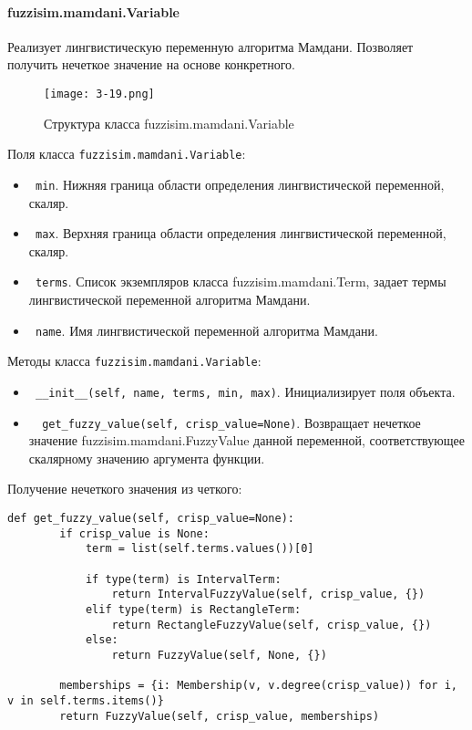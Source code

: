 \paragraph{fuzzisim.mamdani.Variable}
Реализует лингвистическую переменную алгоритма Мамдани. Позволяет получить нечеткое значение на основе конкретного.

\begin{figure}[ht]
	\centering
	\texttt{[image: 3-19.png]}
	\caption{ Структура класса fuzzisim.mamdani.Variable}
\end{figure}

Поля класса \lstinline!fuzzisim.mamdani.Variable!:
\begin{itemize}
	\item \lstinline! min!. Нижняя граница области определения лингвистической переменной, скаляр.
	\item \lstinline! max!. Верхняя граница области определения лингвистической переменной, скаляр.
	\item \lstinline! terms!.   Список экземпляров класса  fuzzisim.mamdani.Term, задает термы лингвистической переменной алгоритма Мамдани.
	\item \lstinline! name!. Имя лингвистической переменной алгоритма Мамдани.
\end{itemize}


Методы класса \lstinline!fuzzisim.mamdani.Variable!:
\begin{itemize}
	\item \lstinline! __init__(self, name, terms, min, max)!. Инициализирует поля объекта.
	\item \lstinline!  get_fuzzy_value(self, crisp_value=None)!. Возвращает нечеткое значение fuzzisim.mamdani.FuzzyValue данной переменной, соответствующее скалярному значению аргумента функции.
\end{itemize}


Получение нечеткого значения из четкого:
\begin{lstlisting}[style=pythonstyle,caption={  }, label=lst:func:1]
	def get_fuzzy_value(self, crisp_value=None):
		if crisp_value is None:
			term = list(self.terms.values())[0]
			
			if type(term) is IntervalTerm:
				return IntervalFuzzyValue(self, crisp_value, {})
			elif type(term) is RectangleTerm:
				return RectangleFuzzyValue(self, crisp_value, {})
			else:
				return FuzzyValue(self, None, {})

		memberships = {i: Membership(v, v.degree(crisp_value)) for i, v in self.terms.items()}
		return FuzzyValue(self, crisp_value, memberships)
\end{lstlisting}




